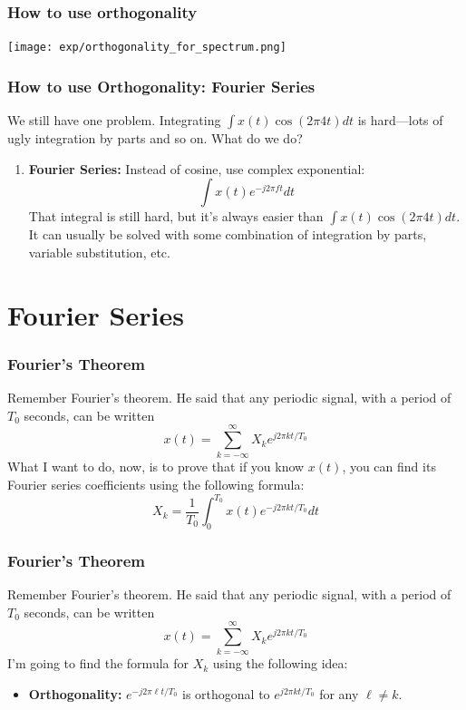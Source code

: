 \documentclass{beamer}
\begin{document}
\begin{frame}
  \frametitle{How to use orthogonality}
  \centerline{\texttt{[image: exp/orthogonality\_for\_spectrum.png]}}
\end{frame}

\begin{frame}
  \frametitle{How to use Orthogonality: Fourier Series}

  We still have one problem.  Integrating $\int x(t) \cos(2\pi 4t)dt$
  is hard---lots of ugly integration by parts and so on.  What do we do?
  \begin{enumerate}
  \item {\bf Fourier Series:} Instead of cosine, use complex
    exponential:
    \[
    \int x(t) e^{-j2\pi ft} dt
    \]
    That integral is still hard, but it's always easier than $\int
    x(t) \cos(2\pi 4t)dt$.  It can usually be solved with some
    combination of integration by parts, variable substitution, etc.
  \end{enumerate}
\end{frame}
  
  
\section[Fourier Series]{Fourier Series}
\setcounter{subsection}{1}

\begin{frame}
  \frametitle{Fourier's Theorem}

  Remember Fourier's theorem.  He said that any periodic signal, with
  a period of $T_0$ seconds, can be written
  \[
  x(t) = \sum_{k=-\infty}^\infty X_k e^{j2\pi kt/T_0}
  \]
  What I want to do, now, is to prove that if you know $x(t)$, you can
  find its Fourier series coefficients using the following formula:
  \[
  X_k = \frac{1}{T_0}\int_0^{T_0} x(t)e^{-j2\pi kt/T_0}dt
  \]
\end{frame}

\begin{frame}
  \frametitle{Fourier's Theorem}

  Remember Fourier's theorem.  He said that any periodic signal, with
  a period of $T_0$ seconds, can be written
  \[
  x(t) = \sum_{k=-\infty}^\infty X_k e^{j2\pi kt/T_0}
  \]
  I'm going to find the formula for $X_k$ using the following idea:
  \begin{itemize}
  \item {\bf Orthogonality:} $e^{-j2\pi \ell t/T_0}$ is orthogonal to
    $e^{j2\pi kt/T_0}$ for any $\ell\ne k$.
  \end{itemize}
\end{frame}
\end{document}

